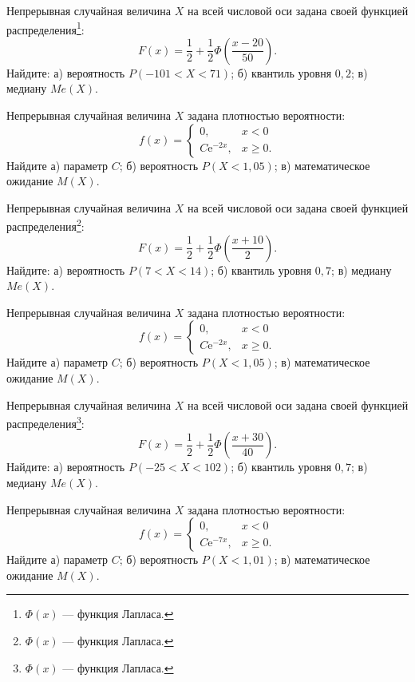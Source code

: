 \vfill

\newpage\setcounter{zad}{0}

\z Непрерывная случайная величина $X$ на всей числовой оси задана своей функцией распределения\footnote{$\Phi(x)$ --- функция Лапласа.}: $$ F(x) = \frac{1}{2} + \frac{1}{2}\Phi\left( \frac{x - 20}{50} \right). $$ Найдите: а) вероятность $P(-101 < X < 71)$; б) квантиль уровня $0{,}2$; в) медиану $Me(X)$.


\vfill

\z Непрерывная случайная величина $X$ задана плотностью вероятности: $$ f(x) = \begin{cases}0, & x < 0 \\ C\mathrm{e}^{-2x}, & x \geqslant 0.\end{cases} $$ Найдите а) параметр $C$; б) вероятность $P(X < 1{,}05)$; в) математическое ожидание $M(X)$.
 

\vfill

\newpage\setcounter{zad}{0}

\z Непрерывная случайная величина $X$ на всей числовой оси задана своей функцией распределения\footnote{$\Phi(x)$ --- функция Лапласа.}: $$ F(x) = \frac{1}{2} + \frac{1}{2}\Phi\left( \frac{x + 10}{2} \right). $$ Найдите: а) вероятность $P(7 < X < 14)$; б) квантиль уровня $0{,}7$; в) медиану $Me(X)$.


\vfill

\z Непрерывная случайная величина $X$ задана плотностью вероятности: $$ f(x) = \begin{cases}0, & x < 0 \\ C\mathrm{e}^{-2x}, & x \geqslant 0.\end{cases} $$ Найдите а) параметр $C$; б) вероятность $P(X < 1{,}05)$; в) математическое ожидание $M(X)$.
 

\vfill

\newpage\setcounter{zad}{0}

\z Непрерывная случайная величина $X$ на всей числовой оси задана своей функцией распределения\footnote{$\Phi(x)$ --- функция Лапласа.}: $$ F(x) = \frac{1}{2} + \frac{1}{2}\Phi\left( \frac{x + 30}{40} \right). $$ Найдите: а) вероятность $P(-25 < X < 102)$; б) квантиль уровня $0{,}7$; в) медиану $Me(X)$.


\vfill

\z Непрерывная случайная величина $X$ задана плотностью вероятности: $$ f(x) = \begin{cases}0, & x < 0 \\ C\mathrm{e}^{-7x}, & x \geqslant 0.\end{cases} $$ Найдите а) параметр $C$; б) вероятность $P(X < 1{,}01)$; в) математическое ожидание $M(X)$.
 


